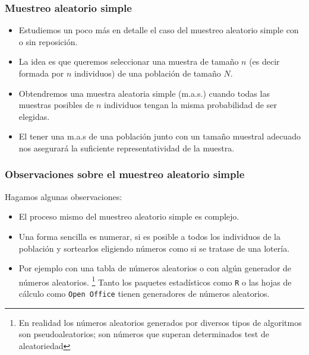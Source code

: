 \begin{frame}
\frametitle{Muestreo aleatorio simple}
\begin{itemize}
\item Estudiemos un poco más en detalle el caso del muestreo aleatorio simple con o sin reposición.
\item La idea es que queremos seleccionar una muestra de tamaño $n$ (es decir formada por $n$ individuos) 
de una población de tamaño $N$.
\item Obtendremos una muestra aleatoria simple (m.a.s.) cuando todas las muestras posibles de $n$ individuos tengan la misma probabilidad de ser elegidas.
\item El tener una m.a.s de una población junto con un tamaño muestral adecuado nos asegurará la suficiente representatividad  de la muestra.
\end{itemize}
\end{frame}

\begin{frame}
\frametitle{Observaciones sobre el muestreo aleatorio simple}
Hagamos algunas observaciones:
\begin{itemize}
\item El proceso mismo del muestreo aleatorio simple es complejo.
\item Una forma sencilla es numerar, si es posible a todos los individuos de la población y sortearlos eligiendo números como si se tratase de una lotería.
\item Por ejemplo con una tabla de números aleatorios o con algún generador de números aleatorios.
\footnote{En realidad los números aleatorios generados por diversos tipos de algoritmos  son pseudoaleatorios; son números que
superan 
determinados test de aleatoriedad} Tanto los paquetes estadísticos como \texttt{R} o las hojas de cálculo como \texttt{Open
Office} 
tienen generadores de números aleatorios.
\end{itemize}
\end{frame}

